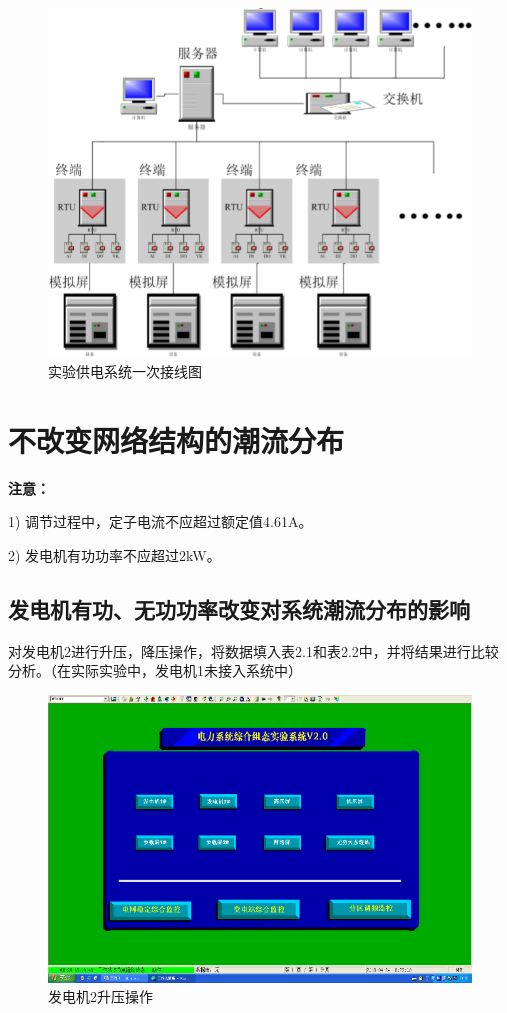 \documentclass[a4paper]{ctexrep}
\begin{document}
                \begin{figure}[htbp]
                    \centering
                    \includegraphics[width=12cm]{2.png}
                    \caption{实验供电系统一次接线图}
                \end{figure}

            \section{不改变网络结构的潮流分布}
                \textbf{注意：}
                
                1) 调节过程中，定子电流不应超过额定值4.61A。
               
                2) 发电机有功功率不应超过2kW。

                \subsection{发电机有功、无功功率改变对系统潮流分布的影响}
                    对发电机2进行升压，降压操作，将数据填入表2.1和表2.2中，并将结果进行比较分析。（在实际实验中，发电机1未接入系统中）

                    \begin{figure}[htbp]
                        \centering
                        \includegraphics[width=12cm]{3.png}
                        \caption{发电机2升压操作}
                    \end{figure}
\end{document}
